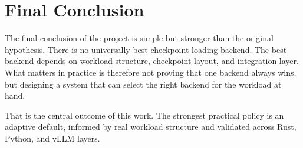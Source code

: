 \section{Final Conclusion}

The final conclusion of the project is simple but stronger than the original hypothesis. There is no universally best checkpoint-loading backend. The best backend depends on workload structure, checkpoint layout, and integration layer. What matters in practice is therefore not proving that one backend always wins, but designing a system that can select the right backend for the workload at hand.

That is the central outcome of this work. The strongest practical policy is an adaptive default, informed by real workload structure and validated across Rust, Python, and vLLM layers.
